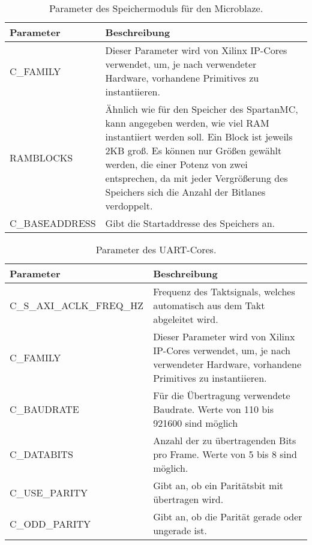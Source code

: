 \begin{table}[ht!]
	\begin{tabular}{|l|p{10cm}|}
		\hline \textbf{Parameter} & \textbf{Beschreibung} \\ 
		\hline C\_FAMILY & Dieser Parameter wird von Xilinx IP-Cores verwendet, um, je nach verwendeter Hardware, vorhandene Primitives zu instantiieren. \\ 
		\hline RAMBLOCKS & Ähnlich wie für den Speicher des SpartanMC, kann angegeben werden, wie viel RAM instantiiert werden soll. Ein Block ist jeweils 2KB groß. Es können nur Größen gewählt werden, die einer Potenz von zwei entsprechen, da mit jeder Vergrößerung des Speichers sich die Anzahl der Bitlanes verdoppelt.\\ 
		\hline C\_BASEADDRESS & Gibt die Startaddresse des Speichers an.\\ 
		\hline 
	\end{tabular}
	\centering
	\caption{Parameter des Speichermoduls für den Microblaze.}
	\label{tab:MemParam}
\end{table}

\begin{table}[ht!]
	\begin{tabular}{|l|p{10cm}|}
		\hline \textbf{Parameter} & \textbf{Beschreibung} \\ 
		\hline C\_S\_AXI\_ACLK\_FREQ\_HZ & Frequenz des Taktsignals, welches automatisch aus dem Takt abgeleitet wird.\\ 
		\hline C\_FAMILY & Dieser Parameter wird von Xilinx IP-Cores verwendet, um, je nach verwendeter Hardware, vorhandene Primitives zu instantiieren.\\ 
		\hline C\_BAUDRATE & Für die Übertragung verwendete Baudrate. Werte von 110 bis 921600 sind möglich \\ 
		\hline C\_DATABITS & Anzahl der zu übertragenden Bits pro Frame. Werte von 5 bis 8 sind möglich. \\ 
		\hline C\_USE\_PARITY & Gibt an, ob ein Paritätsbit mit übertragen wird. \\ 
		\hline C\_ODD\_PARITY & Gibt an, ob die Parität gerade oder ungerade ist. \\ 
		\hline 
	\end{tabular}
	\centering
	\caption{Parameter des UART-Cores.}
	\label{tab:UARTParam}
\end{table}

